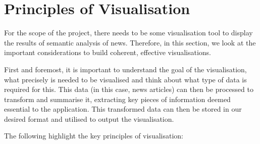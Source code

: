 

\section{Principles of Visualisation} \label{principal_vis}

For the scope of the project, there needs to be some visualisation tool to display the results of semantic analysis of news. Therefore, in this section, we look at the important considerations to build  coherent, effective visualisations. 

First and foremost, it is important to understand the goal of the visualisation, what precisely is needed to be visualised and think about what type of data is required for this. This data (in this case, news articles) can then be processed to transform and summarise it, extracting key pieces of information deemed essential to the application. This transformed data can then be stored in our desired format and utilised to output the visualisation.

The following highlight the key principles of visualisation:

